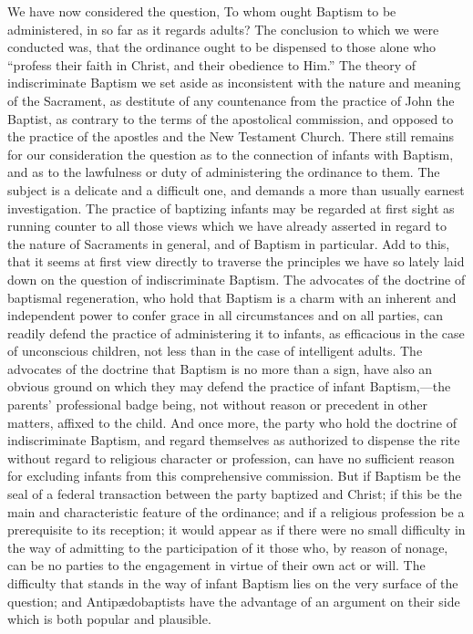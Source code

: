 \documentclass[]{book}
\begin{document}
We have now considered the question, To whom ought Baptism to be administered, in so far as it regards adults? The conclusion to which we were conducted was, that the ordinance ought to be dispensed to those alone who ``profess their faith in Christ, and their obedience to Him.'' The theory of indiscriminate Baptism we set aside as inconsistent with the nature and meaning of the Sacrament, as destitute of any countenance from the practice of John the Baptist, as contrary to the terms of the apostolical commission, and opposed to the practice of the apostles and the New Testament Church. There still remains for our consideration the question as to the connection of infants with Baptism, and as to the lawfulness or duty of administering the ordinance to them. The subject is a delicate and a difficult one, and demands a more than usually earnest investigation. The practice of baptizing infants may be regarded at first sight as running counter to all those views which we have already asserted in regard to the nature of Sacraments in general, and of Baptism in particular. Add to this, that it seems at first view directly to traverse the principles we have so lately laid down on the question of indiscriminate Baptism. The advocates of the doctrine of baptismal regeneration, who hold that Baptism is a charm with an inherent and independent power to confer grace in all circumstances and on all parties, can readily defend the practice of administering it to infants, as efficacious in the case of unconscious children, not less than in the case of intelligent adults. The advocates of the doctrine that Baptism is no more than a sign, have also an obvious ground on which they may defend the practice of infant Baptism,---the parents' professional badge being, not without reason or precedent in other matters, affixed to the child. And once more, the party who hold the doctrine of indiscriminate Baptism, and regard themselves as authorized to dispense the rite without regard to religious character or profession, can have no sufficient reason for excluding infants from this comprehensive commission. But if Baptism be the seal of a federal transaction between the party baptized and Christ; if this be the main and characteristic feature of the ordinance; and if a religious profession be a prerequisite to its reception; it would appear as if there were no small difficulty in the way of admitting to the participation of it those who, by reason of nonage, can be no parties to the engagement in virtue of their own act or will. The difficulty that stands in the way of infant Baptism lies on the very surface of the question; and Antipædobaptists have the advantage of an argument on their side which is both popular and plausible.
\end{document}
